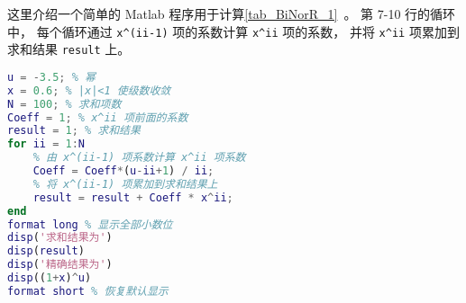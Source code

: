 
这里介绍一个简单的 Matlab 程序用于计算\autoref{tab_BiNorR_1}~。 第 7-10 行的循环中， 每个循环通过 \verb|x^(ii-1)| 项的系数计算 \verb|x^ii| 项的系数， 并将 \verb|x^ii| 项累加到求和结果 \verb|result| 上。

\begin{lstlisting}[language=matlab, caption=binorR.m]
% 验证二项式定理(非整数幂)
u = -3.5; % 幂
x = 0.6; % |x|<1 使级数收敛
N = 100; % 求和项数
Coeff = 1; % x^ii 项前面的系数
result = 1; % 求和结果
for ii = 1:N
    % 由 x^(ii-1) 项系数计算 x^ii 项系数
    Coeff = Coeff*(u-ii+1) / ii; 
    % 将 x^(ii-1) 项累加到求和结果上
    result = result + Coeff * x^ii; 
end
format long % 显示全部小数位
disp('求和结果为')
disp(result)
disp('精确结果为')
disp((1+x)^u)
format short % 恢复默认显示
\end{lstlisting}
